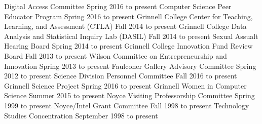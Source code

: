 
\begin{cventries}


  {Digital Access Committee}
  {Spring 2016 to present}
  {Computer Science Peer Educator Program}
  {Spring 2016 to present}
  {Grinnell College Center for Teaching, Learning, and Assessment (CTLA)}
  {Fall 2014 to present}
  {Grinnell College Data Analysis and Statistical Inquiry Lab (DASIL)}
  {Fall 2014 to present}
  {Sexual Assualt Hearing Board}
  {Spring 2014 to present}
  {Grinnell College Innovation Fund Review Board}
  {Fall 2013 to present}
  {Wilson Committee on Entrepreneurship and Innovation}
  {Spring 2013 to present}
  {Faulconer Gallery Advisory Committee}
  {Spring 2012 to present}
  {Science Division Personnel Committee}
  {Fall 2016 to present}
  {Grinnell Science Project}
  {Spring 2016 to present}
  {Grinnell Women in Computer Science}
  {Summer 2015 to present}
  {Noyce Visiting Professorship Committee}
  {Spring 1999 to present}
  {Noyce/Intel Grant Committee}
  {Fall 1998 to present}
  {Technology Studies Concentration}
  {September 1998 to present}

\vspace{1mm}



\end{cventries}
